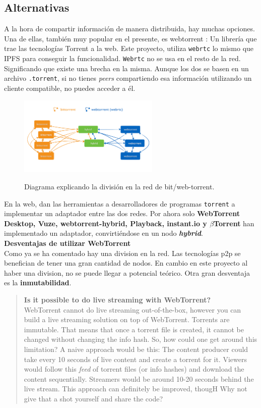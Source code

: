 \subsection{Alternativas}
A la hora de compartir información de manera distribuida, hay muchas opciones. Una de ellas, también muy popular en el presente, es webtorrent \cite{web:webtorrent}: Un librería que trae las tecnologías Torrent a la web.
Este proyecto, utiliza \verb|webrtc| lo mismo que IPFS para conseguir la funcionalidad. \verb|Webrtc| no se usa en el resto de la red. Significando que existe una brecha en la misma. Aunque los dos se basen en un archivo \verb|.torrent|, si no tienes \textit{peers} compartiendo esa información utilizando un cliente compatible, no puedes acceder a él.
\begin{figure}[H]
    \centering
    \includegraphics[width=0.6\textwidth]{Figures/68747470733a2f2f776562746f7272656e742e696f2f696d672f6e6574776f726b2e706e67.png}
    \caption{Diagrama explicando la división en la red de bit/web-torrent.}
    \cite{web:torrent}
    \label{fg:webtorrent}
\end{figure}
En la web, dan las herramientas a desarrolladores de programas \verb|torrent| a implementar un adaptador entre las dos redes. Por ahora solo \textbf{WebTorrent Desktop, Vuze, webtorrent-hybrid, Playback, instant.io y \(\beta\)Torrent} han implementado un adaptador, convirtiéndose en un nodo \textbf{\textit{hybrid}}.\\
\textbf{Desventajas de utilizar WebTorrent}\\
Como ya se ha comentado hay una division en la red. Las tecnologías p2p se benefician de tener una gran cantidad de nodos. En cambio en este proyecto al haber una division, no se puede llegar a potencial teórico.
Otra gran desventaja es la \textbf{inmutabilidad}.
\begin{quote}
    \textbf{Is it possible to do live streaming with WebTorrent?}\\
    WebTorrent cannot do live streaming out-of-the-box, however you can build a live streaming solution on top of WebTorrent.
    Torrents are immutable. That means that once a torrent file is created, it cannot be changed without changing the info hash. So, how could one get around this limitation?
    A naive approach would be this: The content producer could take every 10 seconds of live content and create a torrent for it. Viewers would follow this \textit{feed} of torrent files (or info hashes) and download the content sequentially. Streamers would be around 10-20 seconds behind the live stream.
    This approach can definitely be improved, thougH Why not give that a shot yourself and share the code? \cite{web:webtorrent_faq}
\end{quote}
